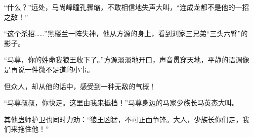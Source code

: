 \begin{this_body}
“什么？”远处，马尚峰瞳孔骤缩，不敢相信地失声大叫，“连成龙都不是他的一招之敌！”

“这个杀招……”黑楼兰一阵失神，他从方源的身上，看到刘家三兄弟“三头六臂”的影子。

“马尊，你的姓命我狼王收下了。”方源淡淡地开口，声音贯穿天地，平静的语调像是再说一件微不足道的小事。

但众人，却从他的话中，感受到一种无敌的气概！

“马尊叔叔，你快走。这里由我来抵挡！”马尊身边的马家少族长马英杰大叫。

其他蛊师护卫也同时力劝：“狼王凶猛，不可正面争锋。大人，少族长你们走，我们来拖住他！”

\end{this_body}

